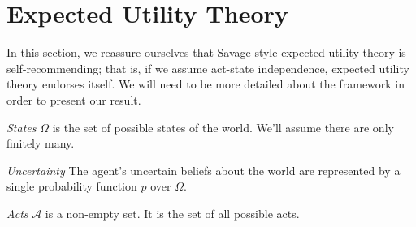 \documentclass[a4paper]{article}
\newcommand\A{\mathcal{A}}
\newenvironment{CCM rewritten}
{\begingroup\color{blue}} %
{\endgroup}              %
\begin{document}




\section{Expected Utility Theory}\label{sect:eut}
In this section, we reassure ourselves that Savage-style expected utility theory is self-recommending; that is, if we assume act-state independence, expected utility theory endorses itself. We will need to be more detailed about the framework in order to present our result. 


 \emph{States } $\Omega$ is the set of possible states of the world. We'll assume there are only finitely many.

\emph{Uncertainty } The agent's uncertain beliefs about the world are represented by a single probability function $p$ over $\Omega$. 

\emph{Acts }
$\A$ is a non-empty set. It is the set of all possible acts. 
\end{document}
